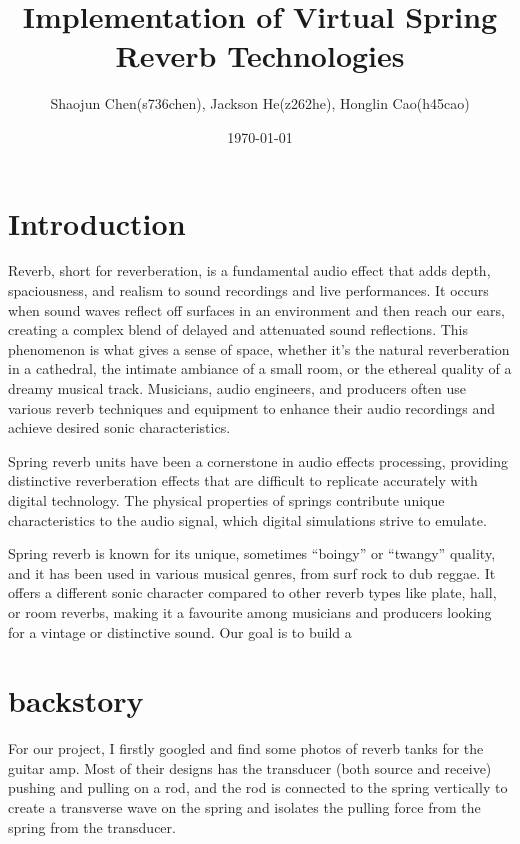 \documentclass[11pt,a4paper]{article}
\begin{document}
\title{Implementation of Virtual Spring Reverb Technologies}
\author{Shaojun Chen(s736chen), Jackson He(z262he), Honglin Cao(h45cao)}
\date{\today}
\maketitle
\tableofcontents
\newpage
\section{Introduction}

Reverb, short for reverberation, is a fundamental audio effect that adds depth, spaciousness, and realism to sound recordings and live performances.  It occurs when sound waves reflect off surfaces in an environment and then reach our ears, creating a complex blend of delayed and attenuated sound reflections.  This phenomenon is what gives a sense of space, whether it’s the natural reverberation in a cathedral, the intimate ambiance of a small room, or the ethereal quality of a dreamy musical track.  Musicians, audio engineers, and producers often use various reverb techniques and equipment to enhance their audio recordings and achieve desired sonic characteristics. 

Spring reverb units have been a cornerstone in audio effects processing, providing distinctive reverberation effects that are difficult to replicate accurately with digital technology.  The physical properties of springs contribute unique characteristics to the audio signal, which digital simulations strive to emulate. 

Spring reverb is known for its unique, sometimes “boingy” or “twangy” quality, and it has been used in various musical genres, from surf rock to dub reggae.  It offers a different sonic character compared to other reverb types like plate, hall, or room reverbs, making it a favourite among musicians and producers looking for a vintage or distinctive sound. Our goal is to build a 


\newpage
\section{backstory}

For our project, I firstly googled and find some photos of reverb tanks for the guitar amp. Most of their designs has the transducer (both source and receive) pushing and pulling on a rod, and the rod is connected to the spring vertically to create a transverse wave on the spring and isolates the pulling force from the spring from the transducer.
\end{document}
